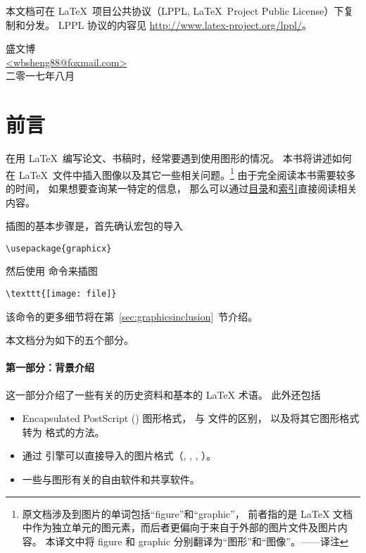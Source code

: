 本文档可在 \LaTeX\ 项目公共协议（LPPL, \LaTeX\ Project Public License）下复制和分发。
LPPL 协议的内容见 \url{http://www.latex-project.org/lppl/}。

\begin{flushright}
盛文博\\
\href{mailto:wbsheng88@foxmail.com}{<wbsheng88@foxmail.com>}\\
二零一七年八月
\end{flushright}

\newpage
\section*{前言}
\label{sect:preface}

在用 \LaTeX\ 编写论文、书稿时，经常要遇到使用图形的情况。
本书将讲述如何在 \LaTeX\ 文件中插入图像以及其它一些相关问题。\footnote{
    原文档涉及到图片的单词包括“figure”和“graphic”，
    前者指的是 \LaTeX{} 文档中作为独立单元的图元素，而后者更偏向于来自于外部的图片文件及图片内容。
    本译文中将 figure 和 graphic 分别翻译为“图形”和“图像”。——译注}
由于完全阅读本书需要较多的时间，
如果想要查询某一特定的信息，
那么可以通过\hyperref[toc]{目录}和\hyperref[sec:index]{索引}直接阅读相关内容。

插图的基本步骤是，首先确认宏包的导入
\begin{lstlisting}
\usepackage{graphicx}
\end{lstlisting}
然后使用  命令来插图
\begin{lstlisting}
\texttt{[image: file]}
\end{lstlisting}
该命令的更多细节将在第~\ref{sec:graphicsinclusion}~节介绍。

本文档分为如下的五个部分。

\paragraph{第一部分：背景介绍}
这一部分介绍了一些有关的历史资料和基本的 \LaTeX{} 术语。
此外还包括
\begin{itemize}
	\item Encapsulated PostScript () 图形格式， 与  文件的区别，
	以及将其它图形格式转为  格式的方法。
	\item 通过 \pdfTeX 引擎可以直接导入的图片格式（, , , \MetaPost）。
	\item 一些与图形有关的自由软件和共享软件。
\end{itemize}

